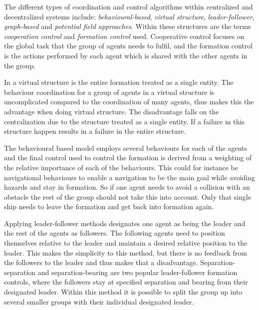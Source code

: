 The different types of coordination and control algorithms within centralized and decentralized systems include: \textit{behavioural-based}, \textit{virtual structure}, \textit{leader-follower}, \textit{graph-based} and \textit{potential field approaches}. Within these structures are the terms \textit{cooperation control} and \textit{formation control} used. Cooperative control focuses on the global task that the group of agents needs to fulfil, and the formation control is the actions performed by each agent which is shared with the other agents in the group. 
\begin{description}[style=nextline]
	\item [Virtual structure]
	In a virtual structure is the entire formation treated as a single entity. The behaviour coordination for a group of agents in a virtual structure is uncomplicated compared to the coordination of many agents, thus makes this the advantage when doing virtual structure. The disadvantage falls on the centralization due to the structure treated as a single entity. If a failure in this structure happen results in a failure in the entire structure.
	\item [Behaviour Based Methods]
	The behavioural based model employs several behaviours for each of the agents and the final control used to control the formation is derived from a weighting of the relative importance of each of the behaviours. This could for instance be navigational behaviours to enable a navigation to be the main goal while avoiding hazards and stay in formation. So if one agent needs to avoid a collision with an obstacle the rest of the group should not take this into account. Only that single ship needs to leave the formation and get back into formation again.
	\item [Leader-Follower Approaches]
	Applying leader-follower methods designates one agent as being the leader and the rest of the agents as followers. The following agents need to position themselves relative to the leader and maintain a desired relative position to the leader. This makes the simplicity to this method, but there is no feedback from the followers to the leader and thus makes that a disadvantage. Separation-separation and separation-bearing are two popular leader-follower formation controls, where the followers stay at specified separation and bearing from their designated leader. Within this method it is possible to split the group up into several smaller groups with their individual designated leader.
	\item [Potential Field Approach]

\end{description}

